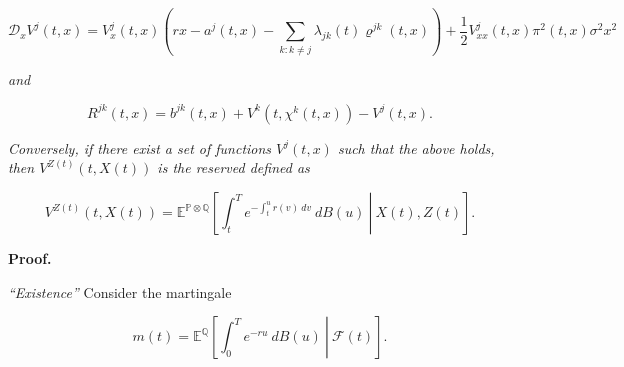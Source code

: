 \documentclass[a4paper,12pt,openany]{book}
\begin{document}
\[
\mathcal D_xV^j(t,x)=V_x^j(t,x)\left(rx-a^j(t,x)-\sum_{k:k\ne j}\lambda_{jk}(t)\varrho^{jk}(t,x)\right)+\frac{1}{2}V^j_{xx}(t,x)\pi^2(t,x)\sigma^2x^2
\]

\emph{and}

\[
R^{jk}(t,x)=b^{jk}(t,x)+V^k(t,\chi^k(t,x))-V^j(t,x).
\]

\emph{Conversely, if there exist a set of functions \(V^j(t,x)\) such that the above holds, then \(V^{Z(t)}(t,X(t))\) is the reserved defined as}

\[
V^{Z(t)}(t,X(t))=\mathbb E^{\mathbb P\otimes\mathbb Q}\left[\left. \int_t^Te^{-\int_t^u r(v)\ dv}\ dB(u)\ \right\vert\ X(t),Z(t)\right].
\]

\textbf{Proof.}

\emph{``Existence''} Consider the martingale

\[
m(t)=\mathbb E^{\mathbb Q}\left[\left. \int_0^Te^{-ru}\ dB(u)\ \right\vert\ \mathcal F(t)\right].
\]
\end{document}
